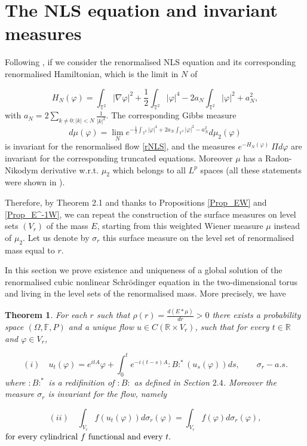 \documentclass[11pt,leqno]{amsart}
\newtheorem{thm}{Theorem}[section]
\newcommand{\R}{\mathbb{R}}
\newcommand{\T}{\mathbb{T}}
\begin{document}
\section{The NLS equation and invariant measures}
Following \cite{B96}, if we consider the renormalised NLS equation and its corresponding renormalised Hamiltonian, which is the limit in $N$ of

$$ H_N(\varphi)  =\int_{\T^2}  |\nabla \varphi|^2 +\frac{1}{2}  \int_{\T^2}  |\varphi|^4 -2 a_N   \int_{\T^2}  |\varphi|^2 +a_N^2 ,$$
with $a_N =2 \sum_{k\neq 0 :|k|<N}   \frac{1}{|k|^2} $. The corresponding Gibbs measure 
$$d\mu (\varphi) =\lim_N  e^{-{\frac{1}{2} } \int_{\T^2}  |\varphi|^4 +2 a_N  \int_{\T^2} |\varphi|^2 -a_N^2}     d\mu_2(\varphi)$$
is invariant for the renormalised flow \eqref{rNLS},  and the measures $e^{-H_N (\varphi)} ~\Pi d\varphi$ are invariant for the corresponding truncated equations. Moreover $\mu$ 
has a Radon-Nikodym derivative w.r.t. $\mu_2$ which belongs to all $L^p$ spaces (all these statements were shown in \cite{B96}). 


Therefore, by Theorem 2.1 and thanks to Propositions  \ref{Prop_EW}  and \ref{Prop_E^-1W}, 
 we can repeat the construction of the surface measures on   level sets $(V_r)$ of the mass $E$,  
  starting from this weighted Wiener measure $\mu$ instead of $\mu_2$. 
 Let us denote by $\sigma_r$ this surface measure on  the level set of renormalised  mass equal to $r$.

In this section we prove  existence and uniqueness  of a global solution of the renormalised cubic nonlinear Schr\"odinger equation in the two-dimensional torus and 
 living in the level sets of the renormalised mass.
More precisely, we have 




\begin{thm}		\label{Th5.1}
For each $r$ such that $\rho (r)=\frac{d(E*\mu)}{dr}>0$ there exists a probability space $(\Omega , \mathbb F, P)$ and a unique flow $u \in C(\mathbb R \times V_r )$, 
such that for every $t\in \R$ and $\varphi \in V_r$,

$$(i) \quad u_t ( \varphi ) =e^{itA}   \varphi   + \int_0^t e^{-i(t-s)A} :B:^\ast  (u_s (\varphi ))ds, \qquad \sigma_r-a.s. $$
where $ :B:^\ast$ is a redifinition of $:B:$ as defined in Section $2.4$. Moreover the measure $\sigma_r$ is invariant for the flow, namely

$$(ii) \quad \int_{V_r}  f(u_t ( \varphi)) d\sigma_r (\varphi)= \int_{V_r} f (\varphi) d\sigma_r (\varphi), $$
$\hbox{for every cylindrical}~f~\hbox{functional  and every}~t.$

\end{thm}
\end{document}
